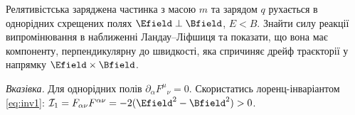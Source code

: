 \begin{problem}\label{prb:LL_crossed}
    Релятивістська заряджена частинка з масою $m$ та зарядом $q$ рухається
    в однорідних схрещених полях $\Efield \perp \Bfield$, $E < B$.
    Знайти силу реакції випромінювання в наближенні Ландау--Ліфшиця
    та показати, що вона має компоненту, перпендикулярну до швидкості,
    яка спричиняє дрейф траєкторії у напрямку $\Efield\times\Bfield$.

    \emph{Вказівка.} Для однорідних полів $\partial_{\alpha}F^{\mu}{}_{\nu}=0$.
    Скористатись лоренц-інваріантом \eqref{eq:inv1}: $\mathcal{I}_1 = F_{\alpha\nu}F^{\alpha\nu} = - 2(\Efield^2 - \Bfield^2) > 0$.





\end{problem}
